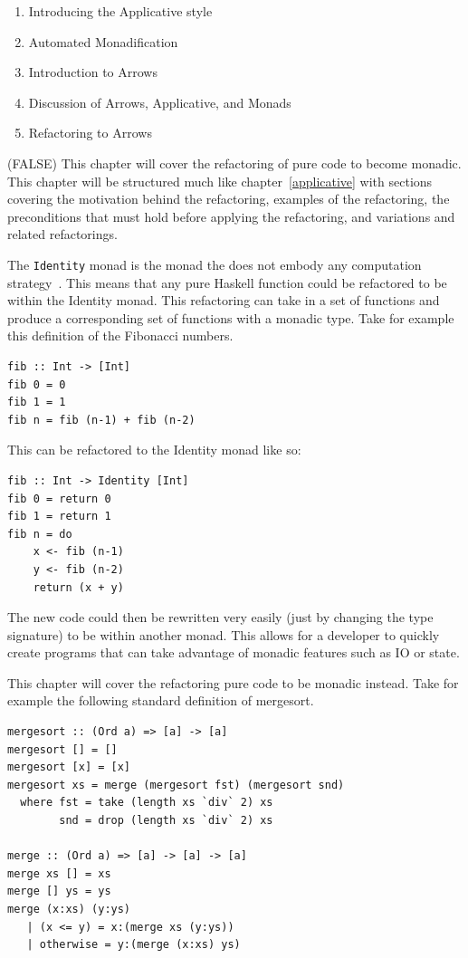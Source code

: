 \begin{enumerate}
\item Introducing the Applicative style
\item Automated Monadification
\item Introduction to Arrows
\item Discussion of Arrows, Applicative, and Monads
\item Refactoring to Arrows
\end{enumerate} 

\if(FALSE)
This chapter will cover the refactoring of pure code to become monadic. This chapter will be structured much like chapter~\ref{applicative} with sections covering the motivation behind the refactoring, examples of the refactoring, the preconditions that must hold before applying the refactoring, and variations and related refactorings. 

The \texttt{Identity} monad is the monad the does not embody any computation strategy~\citep{identityMonad}. This means that any pure Haskell function could be refactored to be within the Identity monad. This refactoring can take in a set of functions and produce a corresponding set of functions with a monadic type. Take for example this definition of the Fibonacci numbers.

\begin{lstlisting}[frame=tblr]
fib :: Int -> [Int]
fib 0 = 0
fib 1 = 1
fib n = fib (n-1) + fib (n-2)
\end{lstlisting} 

This can be refactored to the Identity monad like so:

\begin{lstlisting}[frame=tblr]
fib :: Int -> Identity [Int]
fib 0 = return 0
fib 1 = return 1
fib n = do
	x <- fib (n-1)
	y <- fib (n-2)
	return (x + y)
\end{lstlisting}

The new code could then be rewritten very easily (just by changing the type signature) to be within another monad. This allows for a developer to quickly create programs that can take advantage of monadic features such as IO or state.



This chapter will cover the refactoring pure code to be monadic instead. Take for example the following standard definition of mergesort.

\begin{lstlisting}[frame=tblr]
mergesort :: (Ord a) => [a] -> [a]
mergesort [] = []
mergesort [x] = [x]
mergesort xs = merge (mergesort fst) (mergesort snd)
  where fst = take (length xs `div` 2) xs
        snd = drop (length xs `div` 2) xs

merge :: (Ord a) => [a] -> [a] -> [a]
merge xs [] = xs
merge [] ys = ys
merge (x:xs) (y:ys)
   | (x <= y) = x:(merge xs (y:ys))
   | otherwise = y:(merge (x:xs) ys)
\end{lstlisting}

